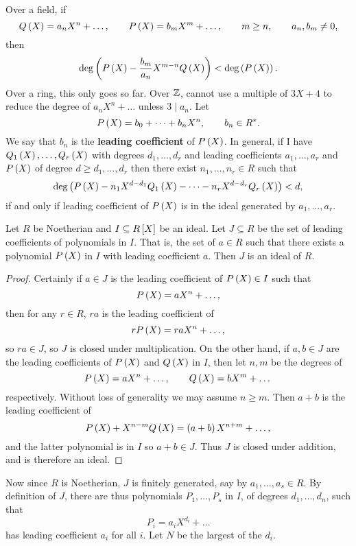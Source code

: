 Over a field, if
$$ Q\rb{X} = a_nX^n + \dots, \qquad P\rb{X} = b_mX^m + \dots, \qquad m \ge n, \qquad a_n, b_m \ne 0, $$
then
$$ \deg\rb{P\rb{X} - \dfrac{b_m}{a_n}X^{m - n}Q\rb{X}} < \deg\rb{P\rb{X}}. $$
Over a ring, this only goes so far. Over $ \Z $, cannot use a multiple of $ 3X + 4 $ to reduce the degree of $ a_nX^n + \dots $ unless $ 3 \mid a_n $. Let
$$ P\rb{X} = b_0 + \dots + b_nX^n, \qquad b_n \in R^*. $$
We say that $ b_n $ is the \textbf{leading coefficient} of $ P\rb{X} $. In general, if I have $ Q_1\rb{X}, \dots, Q_r\rb{X} $ with degrees $ d_1, \dots, d_r $ and leading coefficients $ a_1, \dots, a_r $ and $ P\rb{X} $ of degree $ d \ge d_1, \dots, d_r $ then there exist $ n_1, \dots, n_r \in R $ such that
$$ \deg\rb{P\rb{X} - n_1X^{d - d_1}Q_1\rb{X} - \dots - n_rX^{d - d_r}Q_r\rb{X}} < d, $$
if and only if leading coefficient of $ P\rb{X} $ is in the ideal generated by $ a_1, \dots, a_r $. 

\begin{lemma}
Let $ R $ be Noetherian and $ I \subseteq R\sb{X} $ be an ideal. Let $ J \subseteq R $ be the set of leading coefficients of polynomials in $ I $. That is, the set of $ a \in R $ such that there exists a polynomial $ P\rb{X} $ in $ I $ with leading coefficient $ a $. Then $ J $ is an ideal of $ R $.
\end{lemma}

\begin{proof}
Certainly if $ a \in J $ is the leading coefficient of $ P\rb{X} \in I $ such that
$$ P\rb{X} = aX^n + \dots, $$
then for any $ r \in R $, $ ra $ is the leading coefficient of
$$ rP\rb{X} = raX^n + \dots, $$
so $ ra \in J $, so $ J $ is closed under multiplication. On the other hand, if $ a, b \in J $ are the leading coefficients of $ P\rb{X} $ and $ Q\rb{X} $ in $ I $, then let $ n, m $ be the degrees of
$$ P\rb{X} = aX^n + \dots, \qquad Q\rb{X} = bX^m + \dots $$
respectively. Without loss of generality we may assume $ n \ge m $. Then $ a + b $ is the leading coefficient of
$$ P\rb{X} + X^{n - m}Q\rb{X} = \rb{a + b}X^{n + m} + \dots, $$
and the latter polynomial is in $ I $ so $ a + b \in J $. Thus $ J $ is closed under addition, and is therefore an ideal.
\end{proof}

Now since $ R $ is Noetherian, $ J $ is finitely generated, say by $ a_1, \dots, a_s \in R $. By definition of $ J $, there are thus polynomials $ P_1, \dots, P_s $ in $ I $, of degrees $ d_1, \dots, d_n $, such that
$$ P_i = a_iX^{d_i} + \dots $$
has leading coefficient $ a_i $ for all $ i $. Let $ N $ be the largest of the $ d_i $.

